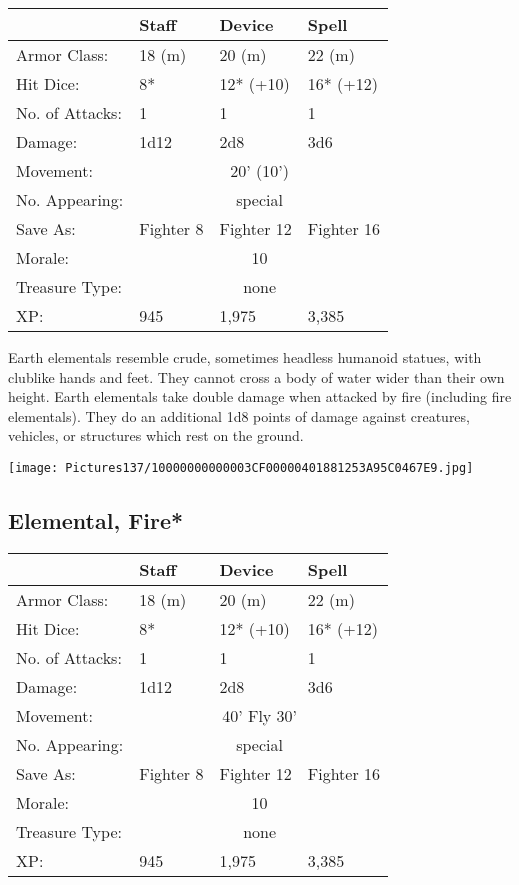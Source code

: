 \documentclass[a4paper,twoside,openany,10pt]{book}
\begin{document}
\begin{multicols}{2}
\begin{tabularx}{0.48\textwidth}{@{}lXXX@{}}
& Staff & Device & Spell \\\hline
Armor Class: & 18 (m) & 20 (m) & 22 (m) \\\hline
Hit Dice: & 8* & 12* (+10) & 16* (+12) \\\hline
No. of Attacks: & 1 & 1 & 1 \\\hline
Damage: & 1d12 & 2d8 & 3d6 \\\hline
Movement: & \multicolumn{3}{c}{20' (10')} \\\hline
No. Appearing: &\multicolumn{3}{c}{special} \\\hline
Save As: & Fighter 8 & Fighter 12 & Fighter 16 \\\hline
Morale: & \multicolumn{3}{c}{10} \\\hline
Treasure Type: & \multicolumn{3}{c}{none} \\\hline
XP: & 945 & 1,975 & 3,385 \\\hline
\end{tabularx}\medskip

Earth elementals resemble crude, sometimes headless humanoid statues, with clublike hands and feet. They cannot cross a body of water wider than their own height. Earth elementals take double damage when attacked by fire (including fire elementals). They do an additional 1d8 points of damage against creatures, vehicles, or structures which rest on the ground.

\begin{center}
	\texttt{[image: Pictures137/10000000000003CF00000401881253A95C0467E9.jpg]}
\end{center}

\columnbreak


\subsection*{Elemental, Fire*}\label{elemental-fire}
\begin{tabularx}{0.48\textwidth}{@{}lllX@{}}
& Staff & Device & Spell \\\hline
Armor Class: & 18 (m) & 20 (m) & 22 (m) \\\hline
Hit Dice: & 8* & 12* (+10) & 16* (+12) \\\hline
No. of Attacks: & 1 & 1 & 1 \\\hline
Damage: & 1d12 & 2d8 & 3d6 \\\hline
Movement:  & \multicolumn{3}{c}{40' Fly 30'}\\\hline
No. Appearing: &\multicolumn{3}{c}{special} \\\hline
Save As: & Fighter 8 & Fighter 12 & Fighter 16 \\\hline
Morale: & \multicolumn{3}{c}{10} \\\hline
Treasure Type: & \multicolumn{3}{c}{none} \\\hline
XP: & 945 & 1,975 & 3,385 \\\hline
\end{tabularx}\medskip


\end{multicols}
\end{document}
